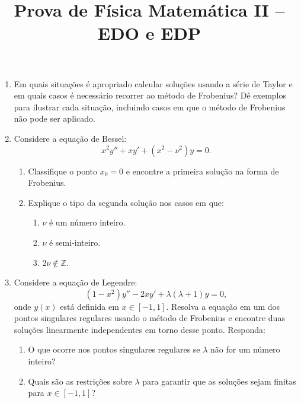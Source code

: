 \newif\ifuseseminar
\useseminartrue


\title{Prova de Física Matemática II -- EDO e EDP}


\begin{enumerate}
	\item Em quais situações é apropriado calcular soluções usando a série de Taylor e
	      em quais casos é necessário recorrer ao método de Frobenius? Dê exemplos para
	      ilustrar cada situação, incluindo casos em que o método de Frobenius não pode ser
	      aplicado.

	\item Considere a equação de Bessel:
	      \[x^2y'' + xy' + (x^2 - \nu^2)y = 0.\]
	      \begin{enumerate}
		      \item Classifique o ponto \(x_0 = 0\) e encontre a primeira solução na
		            forma de Frobenius.
		      \item Explique o tipo da segunda solução nos casos em que:
		            \begin{enumerate}
			            \item \(\nu\) é um número inteiro.
			            \item \(\nu\) é semi-inteiro.
			            \item \(2\nu \notin \mathbb{Z}\).
		            \end{enumerate}
	      \end{enumerate}
	\item Considere a equação de Legendre:
	      \[(1-x^2)y'' - 2xy' + \lambda(\lambda+1)y = 0,\] onde \(y(x)\) está definida
	      em \(x \in [-1,1]\). Resolva a equação em um dos pontos singulares regulares
	      usando o método de Frobenius e encontre duas soluções linearmente
	      independentes em torno desse ponto. Responda:
	      \begin{enumerate}
		      \item O que ocorre nos pontos singulares regulares se \(\lambda\) não for
		            um número inteiro?
		      \item Quais são as restrições sobre \(\lambda\) para garantir que as
		            soluções sejam finitas para \(x \in [-1,1]\)?
	      \end{enumerate}
\end{enumerate}


